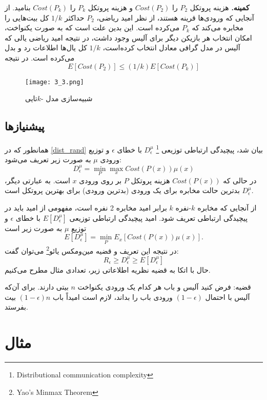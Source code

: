  
\textbf{کمینه.}
 هزینه پروتکل $P_{2}$ را  $Cost(P_{2})$ و هزینه پروتکل $P_{k}$ را $Cost(P_{k})$ بنامید. از آنجایی که ورود‌ی‌ها قرینه هستند، از نظر امید ریاضی، $P_{2}$ حداکثر $1/k$ کل بیت‌هایی را مخابره می‌کند که $P_{k}$ می‌کرده است. این بدین علت است که به صورت یکنواخت، امکان انتخاب هر بازیکن دیگر برای آلیس وجود داشت، در نتیجه امید ریاضی یالی که آلیس در مدل گرافی معادل انتخاب کرده‌است، $1/k$ کل یال‌ها اطلاعات رد و بدل می‌کرده است. در نتیجه
\begin{equation}
	{E}[Cost(P_{2})] \leq (1/k) {E}[Cost(P_{k})]
\end{equation}
\begin{figure}[h]
	\caption{شبیه‌سازی مدل -$k$تایی}
	\centering
	\texttt{[image: 3\_3.png]}
\end{figure}
\subsection{پیشنیازها} %
همانطور که در \autoref{dist_rand} بیان شد، پیچیدگی ارتباطی توزیعی \footnote{Distributional communication complexity} $D_{\epsilon}^{\mu}$ با خطای $\epsilon$ و توزیع ورودی $\mu$ به صورت زیر تعریف می‌شود:
\begin{equation}
	D_{\epsilon}^{\mu} = \min_{P} \max_{x} Cost(P(x))\mu (x)
\end{equation}
در حالی که $Cost(P(x))$ هزینه پروتکل $P$ بر روی ورودی $x$ است. به عبارتی دیگر، $D_{\epsilon}^{\mu}$ بدترین حالت مخابره برای یک ورودی (بدترین ورودی) برای بهترین پروتکل است. 

از آنجایی که مخابره $k$-نفره $k$ برابر امید مخابره 2 نفره است، مفهومی از امید باید در پیچیدگی ارتباطی تعریف شود. امید پیچیدگی ارتباطی توزیعی ${E}[D_{\epsilon}^{\mu}]$ با خطای $\epsilon$ و توزیع $\mu$ به صورت زیر است
\begin{equation}
 {E}[D_{\epsilon}^{\mu}] = \min_{P} {E}_{x}[Cost(P(x))\mu(x)].
\end{equation}
در نتیجه این تعریف و قضیه مین‌ومکس یائو\footnote{Yao's Minmax Theorem} می‌توان گفت:
\begin{equation}
	R_{\epsilon} \geq D^{\mu}_{\epsilon} \geq {E}[D_{\epsilon}^{\mu}]
\end{equation}
حال با اتکا به قضیه نظریه اطلاعاتی زیر، تعدادی مثال مطرح می‌کنیم.\cite{zhang11}

 
{قضیه:}
 فرض کنید آلیس و باب هر کدام یک ورودی یکنواخت $n$ بیتی دارند. برای آن‌که آلیس با احتمال $(1-\epsilon)$ ورودی باب را بداند، لازم است امیداً باب $(1-\epsilon)n$ بیت بفرستد.

\section{مثال}
